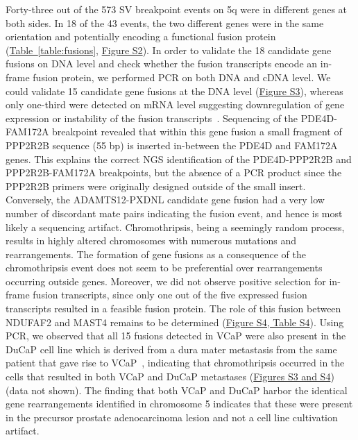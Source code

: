 Forty-three out of the 573 SV breakpoint events on 5q were in different genes at both sides. In 18 of the 43 events, the two different
genes were in the same orientation and potentially encoding a functional fusion protein (\hyperref[table:fusions]{Table~\ref*{table:fusions}}, \href{https://link.springer.com/article/10.1007/s00439-013-1308-1#SupplementaryMaterial}{Figure S2}). In order to validate
the 18 candidate gene fusions on DNA level and check whether the fusion transcripts encode an in-frame fusion protein, we performed
PCR on both DNA and cDNA level. We could validate 15 candidate gene fusions at the DNA level (\href{https://link.springer.com/article/10.1007/s00439-013-1308-1#SupplementaryMaterial}{Figure S3}), whereas only one-third were
detected on mRNA level suggesting downregulation of gene expression or instability of the fusion transcripts~\cite{stephens2011massive}.
Sequencing of the PDE4D-FAM172A breakpoint revealed that within this gene fusion a small fragment of PPP2R2B sequence (55 bp) is inserted
in-between the PDE4D and FAM172A genes. This explains the correct NGS identification of the PDE4D-PPP2R2B and PPP2R2B-FAM172A breakpoints,
 but the absence of a PCR product since the PPP2R2B primers were originally designed outside of the small insert. Conversely, the ADAMTS12-PXDNL
candidate gene fusion had a very low number of discordant mate pairs indicating the fusion event, and hence is most likely a sequencing artifact.
Chromothripsis, being a seemingly random process, results in highly altered chromosomes with numerous mutations and rearrangements. The formation
of gene fusions as a consequence of the chromothripsis event does not seem to be preferential over rearrangements occurring outside genes.
Moreover, we did not observe positive selection for in-frame fusion transcripts, since only one out of the five expressed fusion transcripts
resulted in a feasible fusion protein. The role of this fusion between NDUFAF2 and MAST4 remains to be determined (\href{https://link.springer.com/article/10.1007/s00439-013-1308-1#SupplementaryMaterial}{Figure S4, Table S4}). Using PCR,
we observed that all 15 fusions detected in VCaP were also present in the DuCaP cell line which is derived from a dura mater metastasis from the
same patient that gave rise to VCaP~\cite{lee2001establishment}, indicating that chromothripsis occurred in the cells that resulted in both VCaP and DuCaP
metastases (\href{https://link.springer.com/article/10.1007/s00439-013-1308-1#SupplementaryMaterial}{Figures S3 and S4}) (data not shown). The finding that both VCaP and DuCaP harbor the identical gene rearrangements identified in
chromosome 5 indicates that these were present in the precursor prostate adenocarcinoma lesion and not a cell line cultivation artifact.



